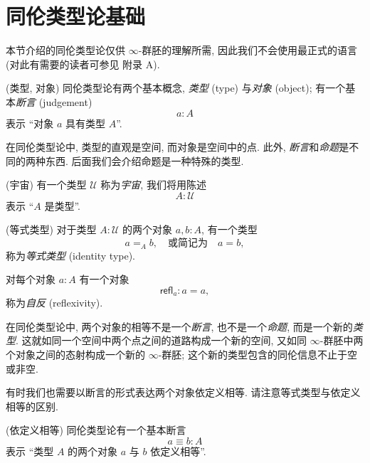 
\setcounter{section}{-1}
\section{同伦类型论基础}

本节介绍的同伦类型论仅供 $\infty$-群胚的理解所需, 因此我们不会使用最正式的语言 (对此有需要的读者可参见 \cite{hottbook} 附录 A).

\begin{axiom}
	{(类型, 对象)}
	同伦类型论有两个基本概念, \emph{类型} (type) 与\emph{对象} (object);
	有一个基本\emph{断言} (judgement)
	\[
	a : A
	\]
	表示 ``对象 $a$ 具有类型 $A$''.
\end{axiom}

\begin{remark}
	{}
	在同伦类型论中, 类型的直观是空间, 而对象是空间中的点.
	此外, \emph{断言}和\emph{命题}是不同的两种东西. 后面我们会介绍命题是一种特殊的类型.
\end{remark}

\begin{axiom}
	{(宇宙)}
	有一个类型 $\mathcal U$ 称为\emph{宇宙},
	我们将用陈述 $$A : \mathcal U$$
	表示 ``$A$ 是类型''.
\end{axiom}

\newcommand{\refl}{\mathsf{refl}}

\begin{axiom}
	{(等式类型)}
	对于类型 $A : \mathcal U$ 的两个对象 $a,b:A$, 有一个类型
	\[
	a=_Ab, \quad\text{或简记为}\quad a=b,
	\]
	称为\emph{等式类型} (identity type).
	
	对每个对象 $a : A$ 有一个对象
	\[
	\refl_a : a=a,
	\]
	称为\emph{自反} (reflexivity).
\end{axiom}

\begin{remark}
	{}
	在同伦类型论中, 两个对象的相等不是一个\emph{断言}, 也不是一个\emph{命题}, 而是一个新的\emph{类型}.
	这就如同一个空间中两个点之间的道路构成一个新的空间,
	又如同 $\infty$-群胚中两个对象之间的态射构成一个新的 $\infty$-群胚;
	这个新的类型包含的同伦信息不止于空或非空.
	
	有时我们也需要以断言的形式表达两个对象依定义相等. 请注意等式类型与依定义相等的区别.
\end{remark}

\begin{axiom}
	{(依定义相等)}
	同伦类型论有一个基本断言
	\[
	a\equiv b : A
	\]
	表示 ``类型 $A$ 的两个对象 $a$ 与 $b$ 依定义相等''.
\end{axiom}

